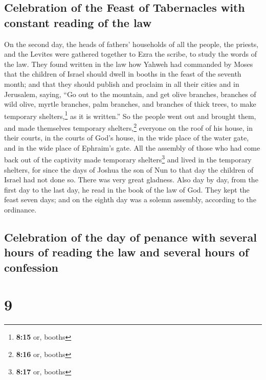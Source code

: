 \hypertarget{celebration-of-the-feast-of-tabernacles-with-constant-reading-of-the-law}{%
\subsection{Celebration of the Feast of Tabernacles with constant
reading of the
law}\label{celebration-of-the-feast-of-tabernacles-with-constant-reading-of-the-law}}

 On the second day, the heads of fathers' households of
all the people, the priests, and the Levites were gathered together to
Ezra the scribe, to study the words of the law.  They
found written in the law how Yahweh had commanded by Moses that the
children of Israel should dwell in booths in the feast of the seventh
month;  and that they should publish and proclaim in all
their cities and in Jerusalem, saying, ``Go out to the mountain, and get
olive branches, branches of wild olive, myrtle branches, palm branches,
and branches of thick trees, to make temporary shelters,\footnote{\textbf{8:15}
  or, booths} as it is written.''  So the people went out
and brought them, and made themselves temporary shelters,\footnote{\textbf{8:16}
  or, booths} everyone on the roof of his house, in their courts, in the
courts of God's house, in the wide place of the water gate, and in the
wide place of Ephraim's gate.  All the assembly of those
who had come back out of the captivity made temporary
shelters\footnote{\textbf{8:17} or, booths} and lived in the temporary
shelters, for since the days of Joshua the son of Nun to that day the
children of Israel had not done so. There was very great gladness.
 Also day by day, from the first day to the last day, he
read in the book of the law of God. They kept the feast seven days; and
on the eighth day was a solemn assembly, according to the ordinance.

\hypertarget{celebration-of-the-day-of-penance-with-several-hours-of-reading-the-law-and-several-hours-of-confession}{%
\subsection{Celebration of the day of penance with several hours of
reading the law and several hours of
confession}\label{celebration-of-the-day-of-penance-with-several-hours-of-reading-the-law-and-several-hours-of-confession}}

\hypertarget{section-8}{%
\section{9}\label{section-8}}

